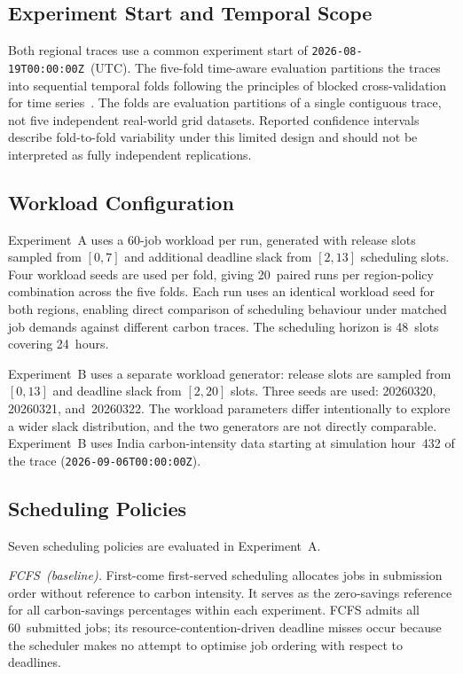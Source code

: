 \documentclass[conference]{IEEEtran}
\begin{document}
\subsection{Experiment Start and Temporal Scope}

Both regional traces use a common experiment start of
\texttt{2026-08-19T00:00:00Z}~(UTC). The five-fold time-aware evaluation
partitions the traces into sequential temporal folds following the principles
of blocked cross-validation for time series~\cite{bergmeir2018note}. The folds
are evaluation partitions of a single contiguous trace, not five independent
real-world grid datasets. Reported confidence intervals describe
fold-to-fold variability under this limited design and should not be
interpreted as fully independent replications.

\subsection{Workload Configuration}
\label{subsec:workload}

Experiment~A uses a 60-job workload per run, generated with release slots
sampled from $[0, 7]$ and additional deadline slack from $[2, 13]$ scheduling
slots. Four workload seeds are used per fold, giving 20~paired runs per
region-policy combination across the five folds. Each run uses an identical
workload seed for both regions, enabling direct comparison of scheduling
behaviour under matched job demands against different carbon traces. The
scheduling horizon is 48~slots covering 24~hours.

Experiment~B uses a separate workload generator: release slots are sampled
from $[0, 13]$ and deadline slack from $[2, 20]$ slots. Three seeds are used:
20260320, 20260321, and~20260322. The workload parameters differ intentionally
to explore a wider slack distribution, and the two generators are not directly
comparable. Experiment~B uses India carbon-intensity data starting at
simulation hour~432 of the trace (\texttt{2026-09-06T00:00:00Z}).

\subsection{Scheduling Policies}

Seven scheduling policies are evaluated in Experiment~A.

\textit{FCFS~(baseline).} First-come first-served scheduling allocates jobs in
submission order without reference to carbon intensity. It serves as the
zero-savings reference for all carbon-savings percentages within each
experiment. FCFS admits all 60~submitted jobs; its resource-contention-driven
deadline misses occur because the scheduler makes no attempt to optimise job
ordering with respect to deadlines.
\end{document}
